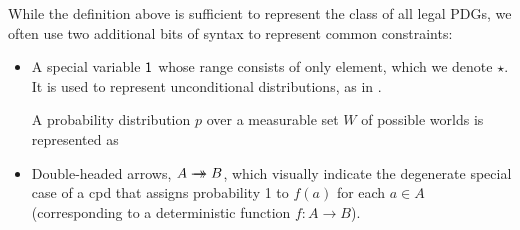 \documentclass{article}
\theoremstyle{plain}
\theoremstyle{definition}
\theoremstyle{remark}
\newcommand{\tto}{\rightarrow\mathrel{\mspace{-15mu}}\rightarrow}
\numberwithin{equation}{section}
\begin{document}
	While the definition above is sufficient to represent the class of all legal PDGs,
	we often use two additional bits of syntax to represent common constraints:  
	\begin{itemize}
	\item A special variable $\sf 1$ 
whose range consists of only element, which we denote $\star$.
It is used to represent
          unconditional distributions, as in
                  .  
	\begin{vleftovers}
		\begin{examplex}\label{ex:worldsonly}
			A probability distribution $p$ over a measurable set $W$ of possible worlds is represented as 
			\begin{center}
			\end{center}
		\end{examplex}
	\end{vleftovers}
		\item Double-headed arrows, $A \tto
                  B$, which visually indicate the degenerate special
                  case of a cpd that assigns probability 1 to $f(a)$
                  for each $a \in A$ (corresponding to a deterministic
                  function $f : A \to B$). 
	\end{itemize}
\end{document}

